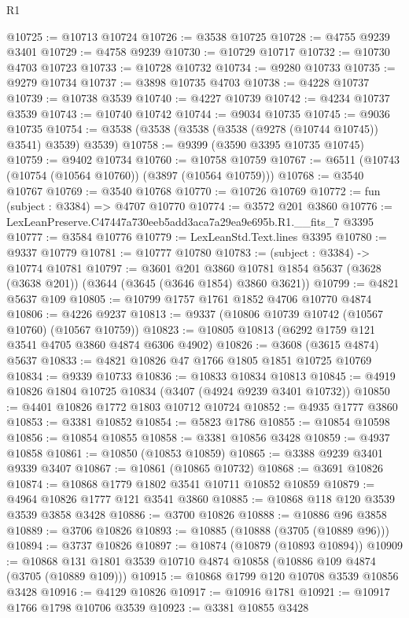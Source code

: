\begin{lexlean}{R1}
\begin{coremodule}
@10725 := @10713 @10724
@10726 := @3538 @10725
@10728 := @4755 @9239 @3401
@10729 := @4758 @9239
@10730 := @10729 @10717
@10732 := @10730 @4703 @10723
@10733 := @10728 @10732
@10734 := @9280 @10733
@10735 := @9279 @10734
@10737 := @3898 @10735 @4703
@10738 := @4228 @10737
@10739 := @10738 @3539
@10740 := @4227 @10739
@10742 := @4234 @10737 @3539
@10743 := @10740 @10742
@10744 := @9034 @10735
@10745 := @9036 @10735
@10754 := @3538 (@3538 (@3538 (@3538 (@9278 (@10744 @10745)) @3541) @3539) @3539)
@10758 := @9399 (@3590 @3395 @10735 @10745)
@10759 := @9402 @10734
@10760 := @10758 @10759
@10767 := @6511 (@10743 (@10754 (@10564 @10760)) (@3897 (@10564 @10759)))
@10768 := @3540 @10767
@10769 := @3540 @10768
@10770 := @10726 @10769
@10772 := fun (subject : @3384) => @4707 @10770
@10774 := @3572 @201 @3860
@10776 := LexLeanPreserve.C47447a730eeb5add3aca7a29ea9e695b.R1.__fits_7 @3395
@10777 := @3584 @10776
@10779 := LexLeanStd.Text.lines @3395
@10780 := @9337 @10779
@10781 := @10777 @10780
@10783 := (subject : @3384) -> @10774 @10781
@10797 := @3601
    @201
    @3860
    @10781
    @1854
    @5637
    (@3628 (@3638 @201))
    (@3644 (@3645 (@3646 @1854) @3860 @3621))
@10799 := @4821 @5637 @109
@10805 := @10799 @1757 @1761 @1852 @4706 @10770 @4874
@10806 := @4226 @9237
@10813 := @9337 (@10806 @10739 @10742 (@10567 @10760) (@10567 @10759))
@10823 := @10805 @10813 (@6292 @1759 @121 @3541 @4705 @3860 @4874 @6306 @4902)
@10826 := @3608 (@3615 @4874) @5637
@10833 := @4821 @10826 @47 @1766 @1805 @1851 @10725 @10769
@10834 := @9339 @10733
@10836 := @10833 @10834 @10813
@10845 := @4919 @10826 @1804 @10725 @10834 (@3407 (@4924 @9239 @3401 @10732))
@10850 := @4401 @10826 @1772 @1803 @10712 @10724
@10852 := @4935 @1777 @3860
@10853 := @3381 @10852
@10854 := @5823 @1786
@10855 := @10854 @10598
@10856 := @10854 @10855
@10858 := @3381 @10856 @3428
@10859 := @4937 @10858
@10861 := @10850 (@10853 @10859)
@10865 := @3388 @9239 @3401 @9339 @3407
@10867 := @10861 (@10865 @10732)
@10868 := @3691 @10826
@10874 := @10868 @1779 @1802 @3541 @10711 @10852 @10859
@10879 := @4964 @10826 @1777 @121 @3541 @3860
@10885 := @10868 @118 @120 @3539 @3539 @3858 @3428
@10886 := @3700 @10826
@10888 := @10886 @96 @3858
@10889 := @3706 @10826
@10893 := @10885 (@10888 (@3705 (@10889 @96)))
@10894 := @3737 @10826
@10897 := @10874 (@10879 (@10893 @10894))
@10909 := @10868 @131 @1801 @3539 @10710 @4874 @10858 (@10886 @109 @4874 (@3705 (@10889 @109)))
@10915 := @10868 @1799 @120 @10708 @3539 @10856 @3428
@10916 := @4129 @10826
@10917 := @10916 @1781
@10921 := @10917 @1766 @1798 @10706 @3539
@10923 := @3381 @10855 @3428

\end{coremodule}
\end{lexlean}
